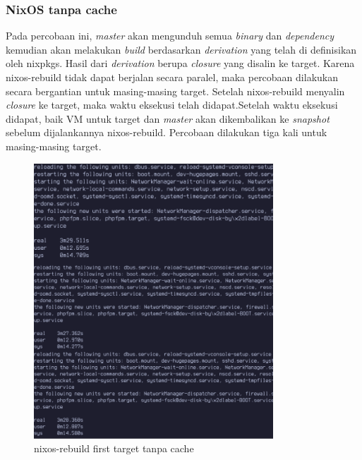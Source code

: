\documentclass[10pt,]{report}
\begin{document}
\begin{adjustwidth}{20pt}{}
	\subsubsection{NixOS tanpa cache}
	\begin{adjustwidth}{20pt}{}
		Pada percobaan ini, \textit{master} akan mengunduh semua \textit{binary}
		dan \textit{dependency} kemudian akan melakukan \textit{build} berdasarkan
		\textit{derivation} yang telah di definisikan oleh nixpkgs. Hasil dari
		\textit{derivation} berupa \textit{closure} yang disalin ke target. Karena
		nixos-rebuild tidak dapat berjalan secara paralel, maka percobaan dilakukan secara bergantian
		untuk masing-masing target. Setelah nixos-rebuild menyalin \textit{closure}
		ke target, maka waktu eksekusi telah didapat.Setelah waktu eksekusi
		didapat, baik VM untuk target dan \textit{master} akan dikembalikan ke
		\textit{snapshot} sebelum dijalankannya nixos-rebuild. Percobaan dilakukan
		tiga kali untuk masing-masing target.
		\begin{figure}[H]
			\begin{center}
				\includegraphics[width=0.8\textwidth]{images/nix-target/nix-pasca-install-25-com.png}
			\end{center}
			\caption{nixos-rebuild first target tanpa cache}
		\end{figure}
		\begin{figure}[H]
			\begin{center}

\end{center}
\end{figure}
\end{adjustwidth}
\end{adjustwidth}
\end{document}
